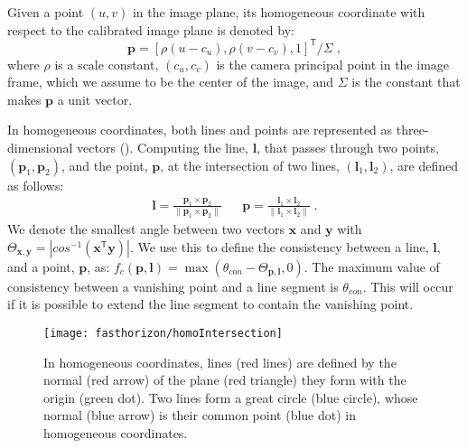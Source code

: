 Given a point $(u,v)$ in the image plane, its homogeneous coordinate
with respect to the calibrated image plane is denoted by:
\begin{displaymath}
  \mathbf{p} = [\rho(u-c_u), \rho(v-c_v), 1]^\mathsf{T} / \Sigma \; ,
\end{displaymath}
where $\rho$ is a scale constant, $(c_u, c_v)$ is the camera principal
point in the image frame, which we assume to be the center of the
image, and $\Sigma$ is the constant that makes $\mathbf{p}$ a unit
vector.

In homogeneous coordinates, both lines and points are represented as
three-dimensional vectors (). Computing the
line, $\mathbf{l}$, that passes through two points, $(\mathbf{p}_1, \mathbf{p}_2)$, and
the point, $\mathbf{p}$, at the intersection of two lines, $(\mathbf{l}_1,
\mathbf{l}_2)$, are defined as follows:
\begin{align}
  \mathbf{l} = \frac{\mathbf{p}_1 \times \mathbf{p}_2}{\|\mathbf{p}_1 \times
    \mathbf{p}_2\|} 
  &&
  \mathbf{p} = \frac{\mathbf{l}_1 \times \mathbf{l}_2}{\|\mathbf{l}_1 \times \mathbf{l}_2\|} \; .
\end{align}
We denote the smallest angle between two vectors $\mathbf{x}$ and
$\mathbf{y}$ with $\Theta_{\mathbf{x},\mathbf{y}}
= |cos^{-1}(\mathbf{x}^\mathsf{T} \mathbf{y})|$.
We use this to define the consistency between a line, $\mathbf{l}$, and a
point,
$\mathbf{p}$, as: $f_c(\mathbf{p}, \mathbf{l}) =
\operatorname*{max}(\theta_{con} - \Theta_{\mathbf{p},\mathbf{l}}, 0)$.
The maximum value of consistency between a vanishing point and a line
segment is $\theta_{con}$. This will occur if it is possible to extend
the line segment to contain the vanishing point.


\begin{figure}
  \centering
  \texttt{[image: fasthorizon/homoIntersection]}
  \caption{In homogeneous coordinates, lines (red lines) are defined
    by the normal (red arrow) of the plane (red triangle) they form
    with the origin (green dot). Two lines form a great circle (blue
    circle), whose normal (blue arrow) is their common point (blue
    dot) in homogeneous coordinates.}
  \label{fig:homoIntersection}
\end{figure}


